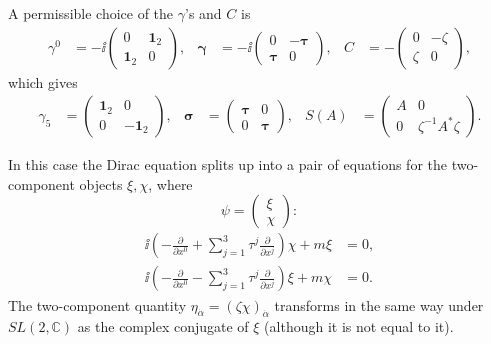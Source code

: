 A permissible choice of the $\gamma$'s and $C$ is
\[
\begin{aligned}
  \gamma^0&=-\ii
  \begin{pmatrix}
    0&\mathbf{1}_2\\
    \mathbf{1}_2&0
  \end{pmatrix}, &
  \boldsymbol{\gamma}&=-\ii
  \begin{pmatrix}
    0&-\boldsymbol{\tau}\\
    \boldsymbol{\tau}&0
  \end{pmatrix}, &
  C&=-\begin{pmatrix}
    0&-\zeta\\
    \zeta&0
  \end{pmatrix},
\end{aligned}
\]
which gives
\[
\begin{aligned}
  \gamma_5&=
  \begin{pmatrix}\mathbf{1}_2&0\\0&-\mathbf{1}_2\end{pmatrix},
  &\boldsymbol{\sigma}&=
  \begin{pmatrix}\boldsymbol{\tau}&0\\0&\boldsymbol{\tau}\end{pmatrix},
  &S(A)&=
  \begin{pmatrix}
    A&0\\
    0&\zeta^{-1}A^*\zeta
  \end{pmatrix}.
\end{aligned}
\]

In this case the Dirac equation splits up into a pair of equations for the
two-component objects $\xi,\chi$, where
\[
  \psi=\begin{pmatrix}\xi\\\chi\end{pmatrix}:
\]
\begin{equation}
\begin{aligned}
  \ii\left(-\frac{\partial}{\partial x^0}
    +\sum_{j=1}^3\tau^j\frac{\partial}{\partial x^j}\right)\chi
    +m\xi&=0,\\
  \ii\left(-\frac{\partial}{\partial x^0}
    -\sum_{j=1}^3\tau^j\frac{\partial}{\partial x^j}\right)\xi
    +m\chi&=0 .
\end{aligned}
\tag{1-46}\label{eq:ch1-two-component-dirac}
\end{equation}
The two-component quantity
$\eta_{\dot\alpha}=(\zeta\chi)_{\dot\alpha}$ transforms in the same way under
$SL(2,\mathbb C)$ as the complex conjugate of $\xi$ (although it is not equal
to it).

